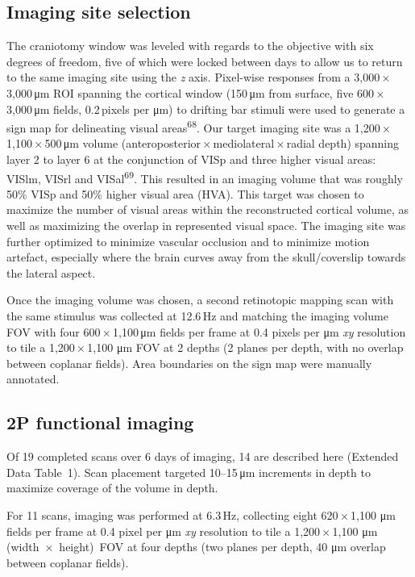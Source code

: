 \documentclass{article}
\begin{document}
\subsection*{Imaging site selection}

The craniotomy window was leveled with regards to the objective with six degrees of freedom, five of which were locked between days to allow us to return to the same imaging site using the \emph{z} axis. Pixel-wise responses from a 3,000\,×\,3,000\,μm ROI spanning the cortical window (150\,μm from surface, five 600\,×\,3,000\,μm fields, 0.2\,pixels per μm) to drifting bar stimuli were used to generate a sign map for delineating visual areas\textsuperscript{68}. Our target imaging site was a 1,200\,×\,1,100\,×\,500\,μm volume (anteroposterior\,×\,mediolateral\,×\,radial depth) spanning layer 2 to layer 6 at the conjunction of VISp and three higher visual areas: VISlm, VISrl and VISal\textsuperscript{69}. This resulted in an imaging volume that was roughly 50\% VISp and 50\% higher visual area (HVA). This target was chosen to maximize the number of visual areas within the reconstructed cortical volume, as well as maximizing the overlap in represented visual space. The imaging site was further optimized to minimize vascular occlusion and to minimize motion artefact, especially where the brain curves away from the skull/coverslip towards the lateral aspect.

Once the imaging volume was chosen, a second retinotopic mapping scan with the same stimulus was collected at 12.6\,Hz and matching the imaging volume FOV with four 600\,×\,1,100\,μm fields per frame at 0.4 pixels per μm \emph{xy} resolution to tile a 1,200\,×\,1,100 μm FOV at 2 depths (2 planes per depth, with no overlap between coplanar fields). Area boundaries on the sign map were manually annotated.

\subsection*{2P functional imaging}

Of 19 completed scans over 6 days of imaging, 14 are described here (Extended Data Table~1). Scan placement targeted 10–15\,μm increments in depth to maximize coverage of the volume in depth.

For 11 scans, imaging was performed at 6.3\,Hz, collecting eight 620\,×\,1,100 μm fields per frame at 0.4 pixel per μm \emph{xy} resolution to tile a 1,200\,×\,1,100 μm (width~×~height)~FOV at four depths (two planes per depth, 40 μm overlap between coplanar fields).
\end{document}
